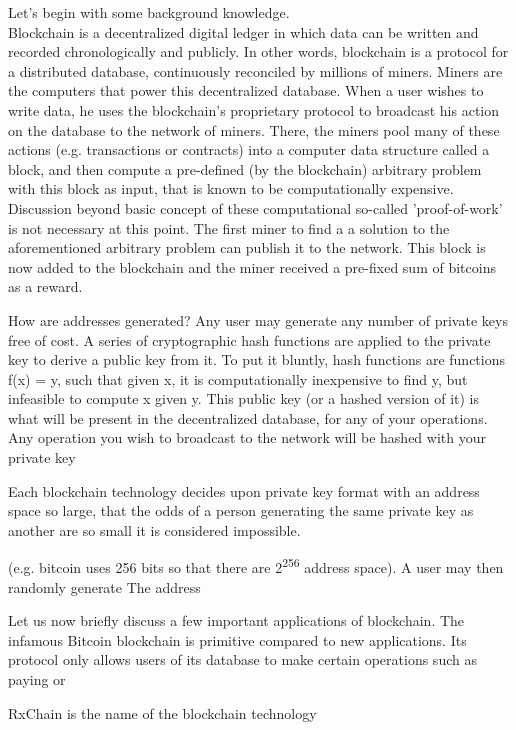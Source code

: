 Let's begin with some background knowledge.\\
Blockchain is a decentralized digital ledger in which data can be written and recorded chronologically and publicly.
In other words, blockchain is a protocol for a distributed database, continuously reconciled by millions of miners.
Miners are the computers that power this decentralized database.
When a user wishes to write data, he uses the blockchain's proprietary protocol to broadcast his action on the database
to the network of miners.
There, the miners pool many of these actions (e.g. transactions or contracts) into a computer data structure called a block,
and then compute a pre-defined (by the blockchain) arbitrary problem with this block as input,
that is known to be computationally expensive.
Discussion beyond basic concept of these computational so-called 'proof-of-work' is not necessary at this point.
The first miner to find a a solution to the aforementioned arbitrary problem can publish it to the network.
This block is now added to the blockchain and the miner received a pre-fixed sum of bitcoins as a reward.

How are addresses generated? 
Any user may generate any number of private keys free of cost.
A series of cryptographic hash functions are applied to the private key to derive a public key from it.
To put it bluntly, hash functions are functions f(x) = y, such that given x, it is computationally inexpensive to find y,
but infeasible to compute x given y.
This public key (or a hashed version of it) is what will be present in the decentralized database, for any of your operations.
Any operation you wish to broadcast to the network will be hashed with your private key



Each blockchain technology decides upon private key format with an address space so large,
that the odds of a person generating the same private key as another are so small it is considered impossible.



(e.g. bitcoin uses 256 bits so that there are 2\textsuperscript{256} address space).
A user may then randomly generate 
The address


Let us now briefly discuss a few important applications of blockchain.
The infamous Bitcoin blockchain is primitive compared to new applications.
Its protocol only allows users of its database to make certain operations such as paying or 


RxChain is the name of the blockchain technology
